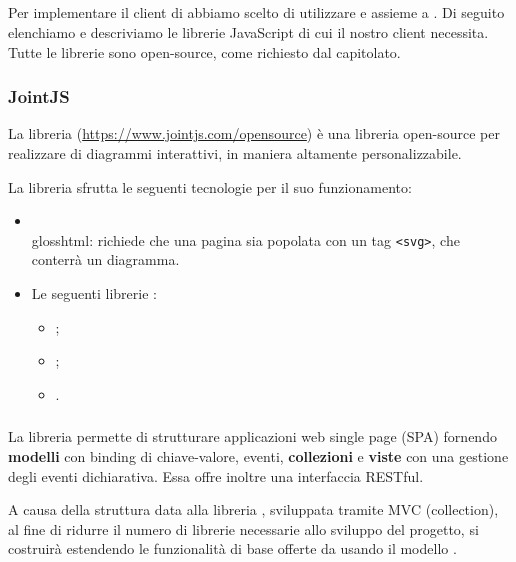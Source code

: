 


\subsection{}
Per implementare il client di \proj{} abbiamo scelto di utilizzare  e  assieme a . Di seguito elenchiamo e descriviamo le librerie JavaScript di cui il nostro client necessita. Tutte le librerie sono open-source, come richiesto dal capitolato.

\subsubsection{JointJS}
La libreria \jointjs{} (\url{https://www.jointjs.com/opensource}) è una libreria open-source per realizzare  di diagrammi interattivi, in maniera altamente personalizzabile. %

La libreria sfrutta le seguenti tecnologie per il suo funzionamento:

\begin{itemize}
	\item \\gloss{html}{}: \jointjs{} richiede che una pagina \html{} sia popolata con un tag \texttt{<svg>}, che conterrà un diagramma.
	\item Le seguenti librerie \js{}:
	\begin{itemize}
		\item \jquery{};
		\item \lodash{};
		\item \backbonejs{}.
	\end{itemize}
\end{itemize}

\subsubsection{\backbonejs}
La libreria \backbonejs{} permette di strutturare applicazioni web single page (SPA) fornendo \textbf{modelli} con binding di chiave-valore, eventi, \textbf{collezioni} e \textbf{viste} con una gestione degli eventi dichiarativa. Essa offre inoltre una interfaccia RESTful.

A causa della struttura data alla libreria \jointjs{}, sviluppata tramite MVC (collection), al fine di ridurre il numero di librerie necessarie allo sviluppo del progetto, si costruirà \proj{} estendendo le funzionalità di base offerte da \jointjs{} usando il modello \mvc{}.


